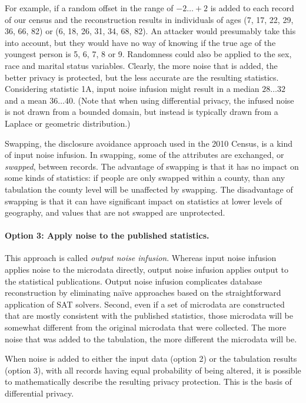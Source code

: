 \documentclass[runningheads]{llncs}
\begin{document}
For example, if a random offset in the range of $-2 \ldots +2$ is
added to each record of our census and the reconstruction results in individuals of
ages (7, 17, 22, 29, 36, 66, 82) or (6, 18, 26, 31, 34, 68,
82). An attacker would presumably take this into account, but they
would have no way of knowing if the true age of the youngest person is
5, 6, 7, 8 or 9. Randomness could also be applied to the sex, race
and marital status variables. Clearly, the more noise that is added,
the better privacy is protected, but the less accurate are the
resulting statistics. Considering statistic 1A, input noise infusion
might result in a median $28\ldots32$ and a mean $36\ldots40$.
(Note that when using differential privacy, the infused noise is not
drawn from a bounded domain, but instead is typically drawn from a
Laplace or geometric distribution.)

Swapping, the disclosure avoidance approach used in the 2010 Census,
is a kind of input noise infusion. In swapping, some of the attributes
are exchanged, or \emph{swapped}, between records. The advantage of
swapping is that it has no impact on some kinds of statistics: if
people are only swapped within a county, than any tabulation the
county level will be unaffected by swapping. The disadvantage of
swapping is that it can have significant impact on statistics at lower
levels of geography, and values that are not swapped are unprotected.

\paragraph{Option 3: Apply noise to the published statistics.} This
approach is called \emph{output noise infusion}. Whereas input noise
infusion applies noise to the microdata directly, output noise
infusion applies output to the statistical publications.  Output noise
infusion complicates database reconstruction by eliminating na\"ive
approaches based on the straightforward application of SAT
solvers. Second, even if a set of microdata are constructed that are
mostly consistent with the published statistics, those microdata will
be somewhat different from the original microdata that were
collected. The more noise that was added to the tabulation, the more
different the microdata will be.

When noise is added to either the input data (option 2) or
the tabulation results (option 3), with all records having equal
probability of being altered, it is possible to mathematically
describe the resulting privacy protection. This is the basis of
differential privacy.
\end{document}
